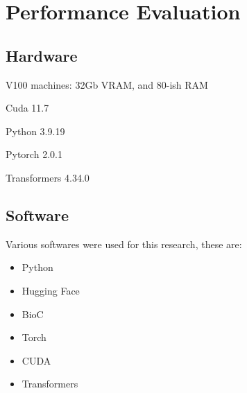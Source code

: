 


\chapter{Performance Evaluation}  

\section{Hardware}
\list{-}
    \item V100 machines: 32Gb VRAM, and 80-ish RAM
    \item Cuda 11.7
    \item Python 3.9.19
    \item Pytorch 2.0.1
    \item Transformers 4.34.0


\section{Software}
Various softwares were used for this research, these are:

\begin{itemize}
	\item{Python}
	\item{Hugging Face}
	\item{BioC}
	\item{Torch}
	\item{CUDA}
	\item{Transformers}

\end{itemize}